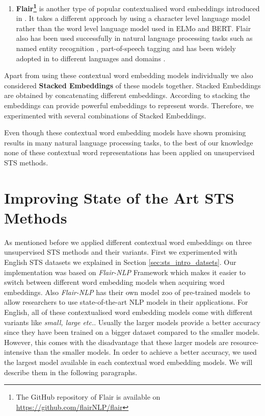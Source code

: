 \begin{enumerate}
\item \textbf{Flair\footnote{The GitHub repository of Flair is available on \url{https://github.com/flairNLP/flair}}} is another type of popular contextualised word embeddings introduced in \citet{akbik-etal-2018-contextual}. It takes a different approach by using a character level language model rather than the word level language model used in ELMo and BERT. Flair also has been used successfully in natural language processing tasks such as named entity recognition \cite{akbik-etal-2019-pooled}, part-of-speech tagging \cite{akbik-etal-2018-contextual} and has been widely adopted in to different languages and domains \cite{akbik-etal-2018-contextual,sharma2019bioflair}.

\end{enumerate}

Apart from using these contextual word embedding models individually we also considered \textbf{Stacked Embeddings} of these models together. Stacked Embeddings are obtained by concatenating different embeddings. According to \citet{akbik-etal-2018-contextual} stacking the embeddings can provide powerful embeddings to represent words. Therefore, we experimented with several combinations of Stacked Embeddings.

Even though these contextual word embedding models have shown promising results in many natural language processing tasks, to the best of our knowledge none of these contextual word representations has been applied on unsupervised STS methods.  



\section{Improving State of the Art STS Methods}
\label{sec:state_method}
As mentioned before we applied different contextual word embeddings on three unsupervised STS methods and their variants. First we experimented with English STS datasets we explained in Section \ref{sec:sts_intro_datsets}. Our implementation was based on \textit{Flair-NLP} Framework \cite{akbik-etal-2019-flair} which makes it easier to switch between different word embedding models when acquiring word embeddings. Also \textit{Flair-NLP} has their own model zoo of pre-trained models to allow researchers to use state-of-the-art NLP models in their applications. For English, all of these contextualised word embedding models come with different variants like \textit{small, large etc.}. Usually the larger models provide a better accuracy since they have been trained on a bigger dataset compared to the smaller models. However, this comes with the disadvantage that these larger models are resource-intensive than the smaller models. In order to achieve a better accuracy, we used the largest model available in each contextual word embedding models. We will describe them in the following paragraphs. 

